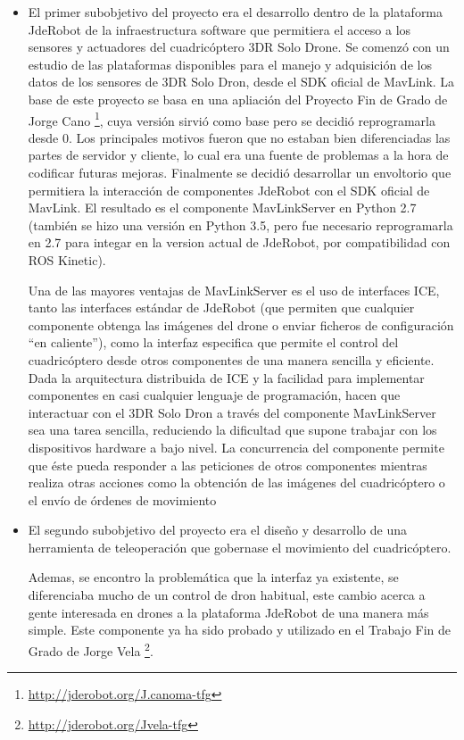 \begin{itemize}
\item El primer subobjetivo del proyecto era el desarrollo dentro de la plataforma JdeRobot de la infraestructura software que permitiera el acceso a los sensores y actuadores del cuadricóptero 3DR Solo Drone. Se comenzó con un estudio de las plataformas disponibles para el manejo y adquisición de los datos de los sensores de 3DR Solo Dron, desde el SDK oficial de MavLink. La base de este proyecto se basa en una apliación del Proyecto Fin de Grado de Jorge Cano \footnote{\url{http://jderobot.org/J.canoma-tfg}}, cuya versión sirvió como base pero se decidió reprogramarla desde 0. Los principales motivos fueron que no estaban bien diferenciadas las partes de servidor y cliente, lo cual era una fuente de problemas a la hora de codificar futuras mejoras. Finalmente se decidió desarrollar un envoltorio que permitiera la interacción de componentes JdeRobot con el SDK oficial de MavLink. El resultado es el componente MavLinkServer en Python 2.7 (también se hizo una versión en Python 3.5, pero fue necesario reprogramarla en 2.7 para integar en la version actual de JdeRobot, por compatibilidad con ROS Kinetic).

Una de las mayores ventajas de MavLinkServer es el uso de interfaces ICE, tanto las interfaces estándar de JdeRobot (que permiten que cualquier componente obtenga las imágenes del drone o enviar ficheros de configuración “en caliente”), como la interfaz especifica que permite el control del cuadricóptero desde otros componentes de una manera sencilla y eficiente. Dada la arquitectura
distribuida de ICE y la facilidad para implementar componentes en casi cualquier lenguaje de programación, hacen que interactuar con el 3DR Solo Dron a través del componente MavLinkServer sea una tarea sencilla, reduciendo la dificultad que supone trabajar con los dispositivos hardware a bajo nivel. La concurrencia del componente permite que éste pueda responder a las peticiones de otros
componentes mientras realiza otras acciones como la obtención de las imágenes del cuadricóptero o el envío de órdenes de movimiento



\item El segundo subobjetivo del proyecto era el diseño y desarrollo de una herramienta de teleoperación que gobernase el movimiento del cuadricóptero.

Ademas, se encontro la problemática que la interfaz ya existente, se diferenciaba mucho de un control de dron habitual, este cambio acerca a gente interesada en drones a la plataforma JdeRobot de una manera más simple. Este componente ya ha sido probado y utilizado en el Trabajo Fin de Grado de Jorge Vela \footnote{\url{http://jderobot.org/Jvela-tfg}}\cite{jvelaTFG}.


\end{itemize}
